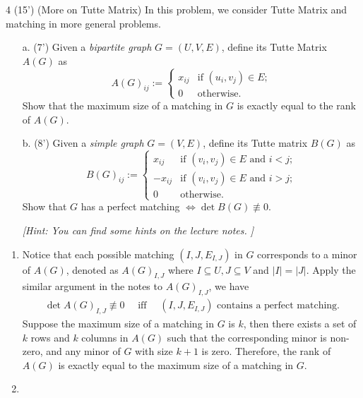 \begin{question}{4 (15') (More on Tutte Matrix)} 
In this problem, we consider Tutte Matrix and matching in more general problems.
\begin{itemize}
	\item[a. (7')] Given a \textit{bipartite graph} $G = (U, V, E)$, define its Tutte Matrix $A(G)$ as 
\begin{equation*}
	A(G)_{ij}:=\begin{cases}
	x_{ij} & \text{if }(u_i,v_j)\in E;\\
	0 & \text{otherwise.}
	\end{cases}
\end{equation*}
Show that the maximum size of a matching in $G$ is exactly equal to the rank of $A(G)$.
	\item[b. (8')] Given a \textit{simple graph} $G=(V,E)$, define its Tutte matrix $B(G)$ as
\begin{equation*}
	B(G)_{ij}:=\begin{cases}
	x_{ij} & \text{if }(v_i,v_j)\in E\text{ and }i<j;\\
	-x_{ij} & \text{if }(v_i,v_j)\in E\text{ and }i>j;\\
	0 & \text{otherwise.}
	\end{cases}
\end{equation*}
Show that $G$ has a perfect matching $\Leftrightarrow\det B(G)\not\equiv 0$. 

\textit{[Hint: You can find some hints on the lecture notes. ]}

\end{itemize}
\end{question}  

\begin{answer}
	\begin{enumerate}[label=\alph*).]
		\item Notice that each possible matching $(I, J, E_{I,J})$ in $G$ corresponds to a minor of $A(G)$, denoted as $A(G)_{I,J}$ where $I\subseteq U, J\subseteq V$ and $|I|=|J|$. 
		Apply the similar argument in the notes to $A(G)_{I,J}$, we have 
		\begin{align*}
			\det A(G)_{I,J} \not \equiv 0 \quad \text{ iff } \quad \text{$(I, J, E_{I,J})$ contains a perfect matching.}
		\end{align*}
		Suppose the maximum size of a matching in $G$ is $k$, then there exists a set of $k$ rows and $k$ columns in $A(G)$ such that the corresponding minor is non-zero, and any minor of $G$ with size $k+1$ is zero. Therefore, the rank of $A(G)$ is exactly equal to the maximum size of a matching in $G$.
		\item 
		\[\]
	\end{enumerate}
\end{answer}
